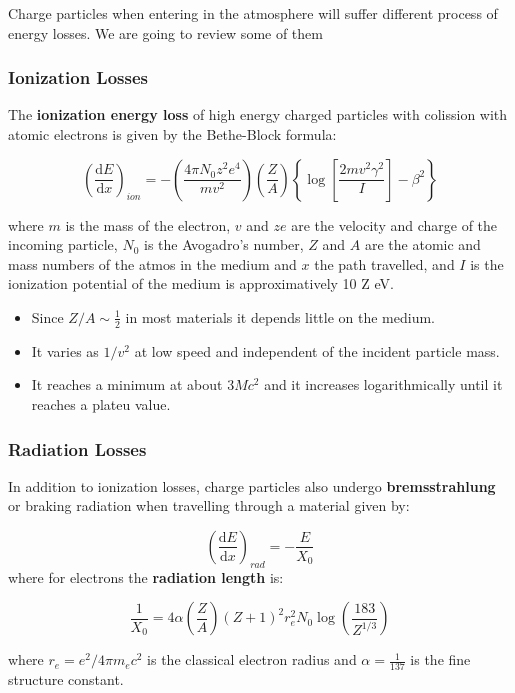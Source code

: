 \documentclass[
  letterpaper,
  DIV=11,
  numbers=noendperiod]{scrreprt}
\providecommand{\tightlist}{%
  \setlength{\itemsep}{0pt}\setlength{\parskip}{0pt}}\usepackage{longtable,booktabs,array}
\begin{document}
Charge particles when entering in the atmosphere will suffer different
process of energy losses. We are going to review some of them

\subsubsection{Ionization Losses}\label{ionization-losses}

The \textbf{ionization energy loss} of high energy charged particles
with colission with atomic electrons is given by the Bethe-Block
formula:

\[\left(\frac{\mathrm{ d} E}{\mathrm{ d} x}\right)_{ion}= -\left(\frac{4\pi N_0z^2e^4}{mv^2}\right)\left(\frac{Z}{A}\right)\left\{\log\left[\frac{2mv^2\gamma^2}{I}\right]-\beta^2\right\}\]

where \(m\) is the mass of the electron, \(v\) and \(ze\) are the
velocity and charge of the incoming particle, \(N_0\) is the Avogadro's
number, \(Z\) and \(A\) are the atomic and mass numbers of the atmos in
the medium and \(x\) the path travelled, and \(I\) is the ionization
potential of the medium is approximatively 10 Z eV.

\begin{itemize}
\tightlist
\item
  Since \(Z/A \sim \frac{1}{2}\) in most materials it depends little on
  the medium.
\item
  It varies as \(1/v^2\) at low speed and independent of the incident
  particle mass.
\item
  It reaches a minimum at about \(3Mc^2\) and it increases
  logarithmically until it reaches a plateu value.
\end{itemize}

\subsubsection{Radiation Losses}\label{radiation-losses}

In addition to ionization losses, charge particles also undergo
\textbf{bremsstrahlung} or braking radiation when travelling through a
material given by:

\[\left(\frac{\mathrm{ d} E}{\mathrm{ d} x}\right)_{rad} = -\frac{E}{X_0}\]
where for electrons the \textbf{radiation length} is:

\[\frac{1}{X_0} = 4 \alpha\left(\frac{Z}{A}\right)(Z + 1)^2r_e^2N_0\log\left(\frac{183}{Z^{1/3}}\right)\]

where \(r_e = e^2/4\pi m_e c^2\) is the classical electron radius and
\(\alpha = \frac{1}{137}\) is the fine structure constant.
\end{document}
